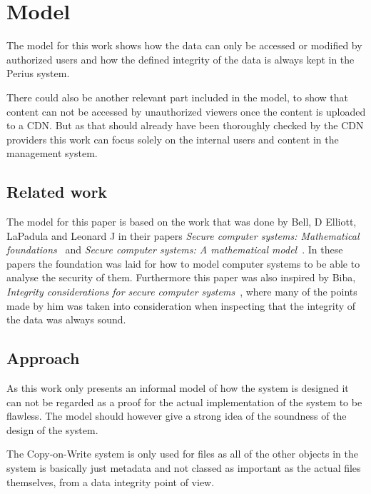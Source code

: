 \documentclass[a4paper,12pt]{article}
\begin{document}
\section{Model} \label{sec:model}
The model for this work shows how the data can only be accessed or modified by authorized
users and how the defined integrity of the data is always kept in the Perius system. 

There could also be another relevant part included in the model, to show that content can not be 
accessed by unauthorized viewers once the content is uploaded to a CDN. But as that should already 
have been thoroughly checked by the CDN providers this work can focus solely on the internal users 
and content in the management system. 

\subsection{Related work}
The model for this paper is based on the work that was done by Bell, D Elliott, LaPadula and 
Leonard J in their papers \textit{Secure computer systems: Mathematical foundations}~\cite{BLP1} 
and \textit{Secure computer systems: A mathematical model}~\cite{BLP2}. 
In these papers the foundation was laid for how to model computer systems to be able to analyse 
the security of them. Furthermore this paper was also inspired by Biba, \textit{Integrity 
considerations for secure computer systems}~\cite{BIBA}, where many of the points made by him was 
taken into consideration when inspecting that the integrity of the data was always sound.

\subsection{Approach}
As this work only presents an informal model of how the system is designed it can not be regarded as
a proof for the actual implementation of the system to be flawless. The model should however give a 
strong idea of the soundness of the design of the system.

The Copy-on-Write system is only used for files as all of the other objects in the system is
basically just metadata and not classed as important as the actual files themselves, from a data
integrity point of view.
\end{document}
